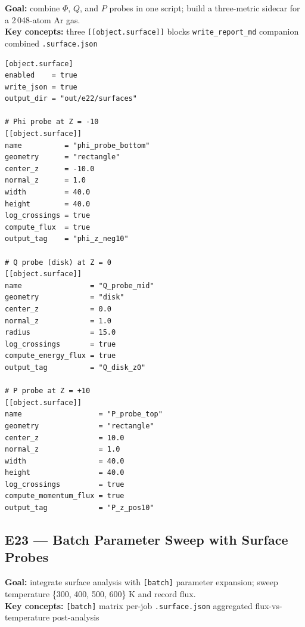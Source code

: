 \documentclass[11pt,a4paper]{article}
\begin{document}
\textbf{Goal:} combine $\Phi$, $Q$, and $P$ probes in one script;
build a three-metric sidecar for a 2\,048-atom Ar gas.\\
\textbf{Key concepts:} three \texttt{[[object.surface]]} blocks \textbullet{}
\texttt{write\_report\_md} companion \textbullet{} combined \texttt{.surface.json}

\begin{tcolorbox}[scriptbox, scriptheader,
  title={scripts/e22\_surface\_multi\_probe\_pipeline.vsim (surface block)}]
\begin{lstlisting}[style=vsimlst]
[object.surface]
enabled    = true
write_json = true
output_dir = "out/e22/surfaces"

# Phi probe at Z = -10
[[object.surface]]
name          = "phi_probe_bottom"
geometry      = "rectangle"
center_z      = -10.0
normal_z      = 1.0
width         = 40.0
height        = 40.0
log_crossings = true
compute_flux  = true
output_tag    = "phi_z_neg10"

# Q probe (disk) at Z = 0
[[object.surface]]
name                = "Q_probe_mid"
geometry            = "disk"
center_z            = 0.0
normal_z            = 1.0
radius              = 15.0
log_crossings       = true
compute_energy_flux = true
output_tag          = "Q_disk_z0"

# P probe at Z = +10
[[object.surface]]
name                  = "P_probe_top"
geometry              = "rectangle"
center_z              = 10.0
normal_z              = 1.0
width                 = 40.0
height                = 40.0
log_crossings         = true
compute_momentum_flux = true
output_tag            = "P_z_pos10"
\end{lstlisting}
\end{tcolorbox}

\subsection*{E23 --- Batch Parameter Sweep with Surface Probes}

\textbf{Goal:} integrate surface analysis with \texttt{[batch]} parameter
expansion; sweep temperature \{300, 400, 500, 600\} K and record flux.\\
\textbf{Key concepts:} \texttt{[batch]} matrix \textbullet{} per-job
\texttt{.surface.json} \textbullet{} aggregated flux-vs-temperature post-analysis
\end{document}
